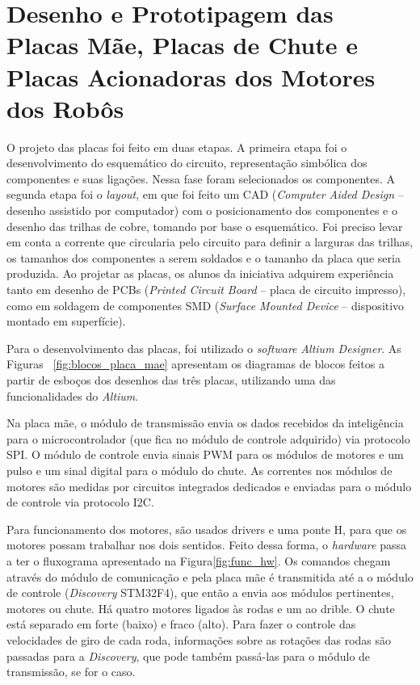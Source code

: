 \chapter{Desenho e Prototipagem das Placas Mãe, Placas de Chute e Placas Acionadoras dos Motores dos Robôs}\label{cap:design_placas}

O projeto das placas foi feito em duas etapas. A primeira etapa foi o desenvolvimento do esquemático do circuito, representação simbólica dos componentes e suas ligações. Nessa fase foram selecionados os componentes. A segunda etapa foi o \textit{layout}, em que foi feito um CAD (\textit{Computer Aided Design} ­– desenho assistido por computador) com o posicionamento dos componentes e o desenho das trilhas de cobre, tomando por base o esquemático. Foi preciso levar em conta a corrente que circularia pelo circuito para definir a larguras das trilhas, os tamanhos dos componentes a serem soldados e o tamanho da placa que seria produzida. Ao projetar as placas, os alunos da iniciativa adquirem experiência tanto em desenho de PCBs (\textit{Printed Circuit Board} – placa de circuito impresso), como em soldagem de componentes SMD (\textit{Surface Mounted Device} – dispositivo montado em superfície).

Para o desenvolvimento das placas, foi utilizado o \textit{software} \textit{Altium Designer}. As Figuras ~\ref{fig:blocos_placa_mae} apresentam os diagramas de blocos feitos a partir de esboços dos desenhos das três placas, utilizando uma das funcionalidades do \textit{Altium}.

Na placa mãe, o módulo de transmissão envia os dados recebidos da inteligência para o microcontrolador (que fica no módulo de controle adquirido) via protocolo SPI.
O módulo de controle envia sinais PWM para os módulos de motores e um pulso e um sinal digital para o módulo do chute. As correntes nos módulos de motores são medidas por circuitos integrados dedicados e enviadas para o módulo de controle via protocolo I2C.

Para funcionamento dos motores, são usados drivers e uma ponte H, para que os motores possam trabalhar nos dois sentidos.
Feito dessa forma, o \textit{hardware} passa a ter o fluxograma apresentado na Figura\ref{fig:func_hw}. Os comandos chegam através do módulo de comunicação e pela placa mãe é transmitida até a o módulo de controle (\textit{Discovery} STM32F4), que então a envia aos módulos pertinentes, motores ou chute. Há quatro motores ligados às rodas e um ao drible. O chute está separado em forte (baixo) e fraco (alto). Para fazer o controle das velocidades de giro de cada roda, informações sobre as rotações das rodas são passadas para a \textit{Discovery}, que pode também passá-las para o módulo de transmissão, se for o caso.

